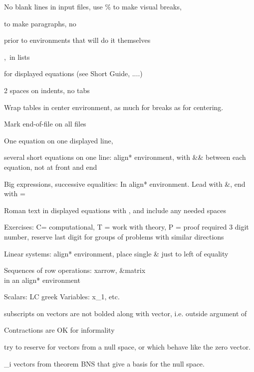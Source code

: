 No blank lines in input files, use \% to make visual breaks, \par to make paragraphs, no \par prior to environments that will do it themselves

,\, in lists

\[  \] for displayed equations (see Short Guide, ....)

2 spaces on indents, no tabs

Wrap tables in center environment, as much for breaks as for centering.

Mark end-of-file on all files

One equation on one displayed line, \begin{equation*}  \end{equation*}

several short equations on one line:  
align* environment, with && between each equation, not at front and end

Big expressions, successive equalities:
In align* environment.  Lead with  &,  end with  =\

Roman text in displayed equations with  \text{}, and include any needed spaces

Exercises:  C= computational, T = work with theory, P = proof required
3 digit number, reserve last digit for groups of problems with similar directions

Linear systems:  align* environment, place single & just to left of equality

Sequences of row operations:  xarrow, &\quad  matrix\\  in an align* environment

Scalars:  LC greek
Variables:  x_1, etc.

subscripts on vectors are not bolded along with vector, i.e. outside argument of \vect{}

Contractions are OK for informality

 try to reserve for vectors from a null space, or which behave like the zero vector.

_i  vectors from theorem BNS that give a basis for the null space.
